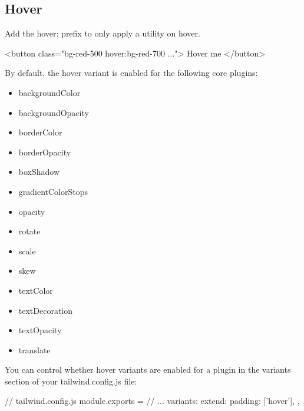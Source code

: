 \documentclass{report}
\begin{document}
    \subsection{Hover}
    \bigbreak \noindent 
    Add the hover: prefix to only apply a utility on hover.
    \bigbreak \noindent 
    \begin{htmlcode}
        <button class="bg-red-500 hover:bg-red-700 ...">
            Hover me
        </button>
    \end{htmlcode}
    \bigbreak \noindent 
    By default, the hover variant is enabled for the following core plugins:
    \begin{itemize}
        \item backgroundColor
        \item backgroundOpacity
        \item borderColor
        \item borderOpacity
        \item boxShadow
        \item gradientColorStops
        \item opacity
        \item rotate
        \item scale
        \item skew
        \item textColor
        \item textDecoration
        \item textOpacity
        \item translate
    \end{itemize}
    \bigbreak \noindent 
    You can control whether hover variants are enabled for a plugin in the variants section of your tailwind.config.js file:
    \bigbreak \noindent 
    \begin{cppcode}
        // tailwind.config.js
        module.exports = {
            // ...
            variants: {
                extend: {
                    padding: ['hover'],
                }
            },
        }
    \end{cppcode}

    \bigbreak \noindent 
\end{document}
